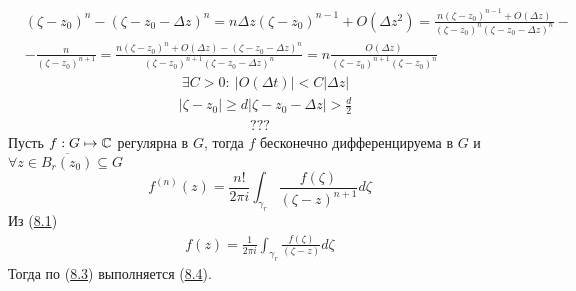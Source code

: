 \begin{align*}
  & (\zeta-z_0)^n - (\zeta - z_0 - \Delta z)^n = n\Delta z(\zeta - z_0)^{n-1} + O(\Delta z^2) = \frac{n(\zeta-z_0)^{n-1}+O(\Delta z)}{(\zeta - z_0)^n(\zeta-z_0-\Delta z)^n} - \\
  & - \frac{n}{(\zeta - z_0)^{n+1}} = \frac{n(\zeta-z_0)^n+O(\Delta z) - (\zeta-z_0-\Delta z)^n}{(\zeta - z_0)^{n+1}(\zeta - z_0 - \Delta z)^n} = n \frac{O(\Delta z)}{(\zeta - z_0)^{n+1}(\zeta - z_0)^n}
\end{align*}
\begin{align*}
  & \exists C > 0: \ \left| O(\Delta t) \right| < C \left| \Delta z \right|
\end{align*}
\begin{align*}
  & \left| \zeta - z_0 \right| \geq d \left| \zeta - z_0 - \Delta z \right| > \frac{d}{2}
\end{align*}
\begin{align*}
  ???
\end{align*}
\theorem
Пусть $f: G \mapsto \mathbb{C}$ регулярна в $G$, тогда $f$ бесконечно дифференцируема в
$G$ и $\forall z \in \overline{B_r(z_0)} \subseteq G$
\begin{equation} \label{(8.4)}
    f^{(n)}(z) = \frac{n!}{2 \pi i}\int_{\gamma_r}\frac{f(\zeta)}{(\zeta - z)^{n+1}}d\zeta
\end{equation}
\pr
Из (\href{(8.1)}{8.1})
\begin{align*}
  f(z) = \frac{1}{2 \pi i}\int_{\gamma_r}\frac{f(\zeta)}{(\zeta - z)}d\zeta
\end{align*}
Тогда по (\href{(8.3)}{8.3}) выполняется (\href{(8.4)}{8.4}).

